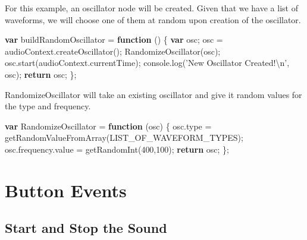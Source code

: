 \documentclass[]{article}
\newenvironment{Shaded}{}{}
\newcommand{\KeywordTok}[1]{\textbf{#1}}
\newcommand{\DecValTok}[1]{#1}
\newcommand{\SpecialCharTok}[1]{#1}
\newcommand{\StringTok}[1]{#1}
\newcommand{\VariableTok}[1]{#1}
\newcommand{\ControlFlowTok}[1]{\textbf{#1}}
\newcommand{\OperatorTok}[1]{#1}
\newcommand{\AttributeTok}[1]{#1}
\newcommand{\NormalTok}[1]{#1}
\begin{document}
For this example, an oscillator node will be created. Given that we have
a list of waveforms, we will choose one of them at random upon creation
of the oscillator.

\begin{Shaded}
\begin{Highlighting}[]
\KeywordTok{var}\NormalTok{ buildRandomOscillator }\OperatorTok{=} \KeywordTok{function}\NormalTok{ () }\OperatorTok{\{}
    \KeywordTok{var}\NormalTok{ osc}\OperatorTok{;}
\NormalTok{    osc }\OperatorTok{=} \VariableTok{audioContext}\NormalTok{.}\AttributeTok{createOscillator}\NormalTok{()}\OperatorTok{;}
    \AttributeTok{RandomizeOscillator}\NormalTok{(osc)}\OperatorTok{;}
    \VariableTok{osc}\NormalTok{.}\AttributeTok{start}\NormalTok{(}\VariableTok{audioContext}\NormalTok{.}\AttributeTok{currentTime}\NormalTok{)}\OperatorTok{;}
    \VariableTok{console}\NormalTok{.}\AttributeTok{log}\NormalTok{(}\StringTok{'New Oscillator Created!}\SpecialCharTok{\textbackslash{}n}\StringTok{'}\OperatorTok{,}\NormalTok{ osc)}\OperatorTok{;}
    \ControlFlowTok{return}\NormalTok{ osc}\OperatorTok{;}
\OperatorTok{\};}  
\end{Highlighting}
\end{Shaded}

RandomizeOscillator will take an existing oscillator and give it random
values for the type and frequency.

\begin{Shaded}
\begin{Highlighting}[]
\KeywordTok{var}\NormalTok{ RandomizeOscillator }\OperatorTok{=} \KeywordTok{function}\NormalTok{ (osc) }\OperatorTok{\{}
    \VariableTok{osc}\NormalTok{.}\AttributeTok{type} \OperatorTok{=} \AttributeTok{getRandomValueFromArray}\NormalTok{(LIST_OF_WAVEFORM_TYPES)}\OperatorTok{;}
    \VariableTok{osc}\NormalTok{.}\VariableTok{frequency}\NormalTok{.}\AttributeTok{value} \OperatorTok{=} \AttributeTok{getRandomInt}\NormalTok{(}\DecValTok{400}\OperatorTok{,}\DecValTok{100}\NormalTok{)}\OperatorTok{;}
    \ControlFlowTok{return}\NormalTok{ osc}\OperatorTok{;}
\OperatorTok{\};}
\end{Highlighting}
\end{Shaded}

\section{Button Events}\label{button-events}

\subsection{Start and Stop the Sound}\label{start-and-stop-the-sound}
\end{document}
